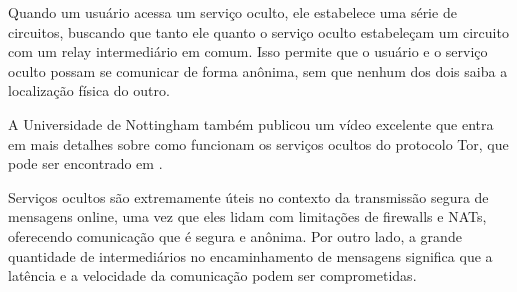 Quando um usuário acessa um serviço oculto, ele estabelece uma série de circuitos, buscando que tanto ele quanto o serviço oculto estabeleçam um circuito com um relay intermediário em comum. Isso permite que o usuário e o serviço oculto possam se comunicar de forma anônima, sem que nenhum dos dois saiba a localização física do outro.

A Universidade de Nottingham também publicou um vídeo excelente que entra em mais detalhes sobre como funcionam os serviços ocultos do protocolo Tor, que pode ser encontrado em \cite{computerphile-hidden-services}.

Serviços ocultos são extremamente úteis no contexto da transmissão segura de mensagens online, uma vez que eles lidam com limitações de firewalls e NATs, oferecendo comunicação que é segura e anônima. Por outro lado, a grande quantidade de intermediários no encaminhamento de mensagens significa que a latência e a velocidade da comunicação podem ser comprometidas.